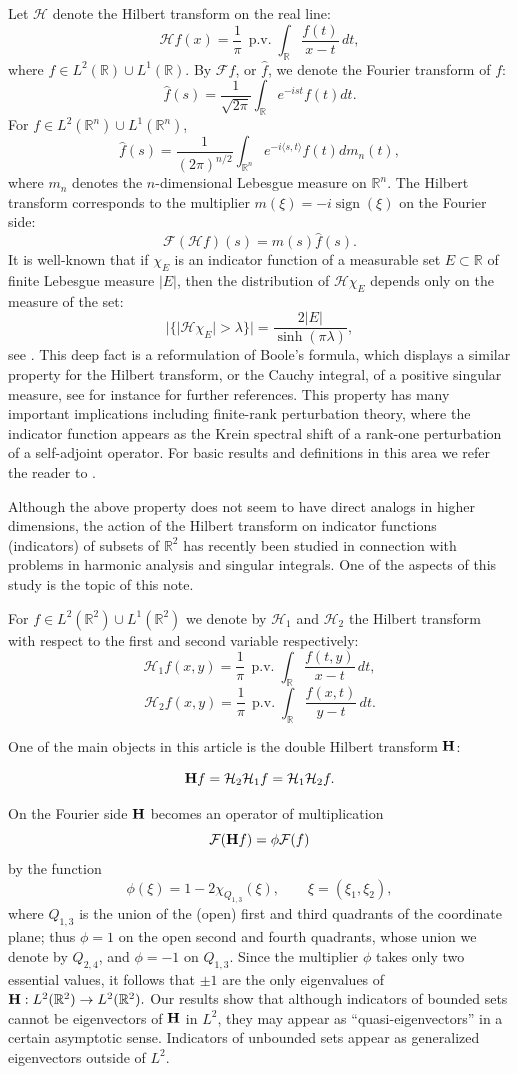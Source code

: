 \documentclass{article}
\newcommand{\tmop}[1]{\ensuremath{\operatorname{#1}}}
\def\H{{\bf H}}
\def\HH{{\mathcal H}}
\def\R{{\mathbb R}}
\newcommand{\pv}{\operatorname{p.v.}}
\begin{document}
	Let $\mathcal{H}$ denote the Hilbert transform on the real line:
	$$\mathcal Hf(x)=\frac 1{\pi}\,\pv\int_\R \frac{f(t)}{x-t}\,dt,$$
	where $f\in L^2(\R)\cup L^1(\R)$. By $\mathcal Ff$, or $\hat f$, we denote the Fourier transform of $f$:
	$$\hat f(s)=\frac1{\sqrt{2\pi}}\int_\R e^{-ist}f(t)dt.$$
	For $f\in L^2(\R^n)\cup L^1(\R^n)$,
	$$\hat f(s)=\frac1{(2\pi)^{n/2}}\int_{\R^n} e^{-i\langle s,t\rangle}f(t)dm_n(t),$$
	where $m_n$ denotes the $n$-dimensional Lebesgue measure on $\R^n$.
	The Hilbert transform corresponds to the multiplier $m(\xi)=- i \tmop{sign} (\xi)$ on the Fourier side:
	$$\mathcal F(\HH f)(s)=m(s)\hat f(s).$$
	It is well-known that if $\chi_E$ is an indicator function of a measurable set $E\subset \R$
	of finite Lebesgue measure $|E|$, then the distribution of $\mathcal H\chi_E$ depends only on the measure of the set:
	$$|\{|\HH\chi_E|>\lambda\}|=\frac{2|E|}{\sinh (\pi\lambda)},$$
	see \cite{SW, La}. This deep fact is a reformulation of Boole's formula, which displays a similar property for the Hilbert transform, or the Cauchy integral, of a positive singular measure, see for instance \cite{Po} for further references. This property has many important implications including finite-rank perturbation theory, where the indicator function appears as the Krein spectral shift of a rank-one perturbation of a self-adjoint operator. For basic results and definitions in this area we refer the reader to \cite{K, A-D, M-P, P2, S}.

	Although the above property does not seem to have direct analogs in higher dimensions, the action of the Hilbert transform on indicator functions (indicators) of subsets of $\R^2$ has recently been studied in connection with problems in harmonic analysis and singular integrals. One of the aspects of this study is the topic of this note.


	For $f\in L^2(\R^2)\cup L^1(\R^2)$ we denote by $\HH_1$ and $\HH_2$ the Hilbert transform
	with respect to the first and second variable respectively:
	$$\HH_1f(x,y)=\frac 1{\pi}\,\pv\int_\R \frac{f(t,y)}{x-t}\,dt,$$
	$$\HH_2f(x,y)=\frac 1{\pi}\,\pv\int_\R \frac{f(x,t)}{y-t}\,dt.$$

	One of the main objects in this article is the double Hilbert transform
	$\H$:

	$$\H f=\mathcal{H}_2 \mathcal{H}_1 f=\mathcal{H}_1 \mathcal{H}_2 f.$$


	On the Fourier side $\H$ becomes an operator of multiplication
	\begin{equation}\mathcal F(\H f)=\phi\mathcal F(f)
		\label{eq1}\end{equation}
	by the function $$\phi(\xi)=1-2\chi_{Q_{1,3}}(\xi),\qquad \xi=(\xi_1,\xi_2),$$ where $Q_{1,3}$ is the union of the (open) first and third quadrants of the coordinate plane; thus $\phi=1$ on the open second and fourth quadrants, whose union we denote by $Q_{2,4}$, and $\phi=-1$ on $Q_{1,3}$. Since the multiplier $\phi$ takes only two essential values, it follows that $\pm 1$ are the only eigenvalues of
	$\H: L^2(\R^2)\to L^2(\R^2).$ Our results show that although indicators of bounded sets cannot be eigenvectors of $\H$ in $L^2$, they may appear as ``quasi-eigenvectors'' in a certain asymptotic sense. Indicators of unbounded sets appear as generalized eigenvectors outside of $L^2$.
\end{document}
